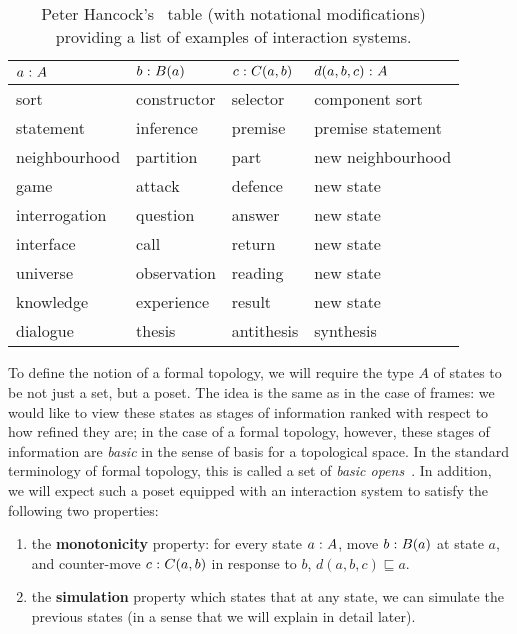 \begin{table}[tbp]
  \centering
  \caption[Hancock's table of examples of interaction systems]{%
    Peter Hancock's~\cite{hancock-interaction-systems} table (with notational
    modifications) providing a list of examples of interaction systems.
  }
  \label{tab:hancock}
  \begin{tabular}{l l l l}
    $a\hspace{0.1mm}:\hspace{0.1mm}A$ & $b\hspace{0.1mm}:\hspace{0.1mm}B(a)$ & $c\hspace{0.1mm}:\hspace{0.1mm}C(a, b)$ & $d(a, b, c)\hspace{0.1mm}:\hspace{0.1mm}A$ \\\hline
    sort           & constructor       & selector             & component sort          \\
    statement      & inference         & premise              & premise statement       \\
    neighbourhood  & partition         & part                 & new neighbourhood       \\
    game           & attack            & defence              & new state               \\
    interrogation  & question          & answer               & new state               \\
    interface      & call              & return               & new state               \\
    universe       & observation       & reading              & new state               \\
    knowledge      & experience        & result               & new state               \\
    dialogue       & thesis            & antithesis           & synthesis               \\
  \end{tabular}
\end{table}

To define the notion of a formal topology, we will require the type $A$ of states to be
not just a set, but a poset. The idea is the same as in the case of frames: we would like
to view these states as stages of information ranked with respect to how refined they are;
in the case of a formal topology, however, these stages of information are \emph{basic} in
the sense of basis for a topological space. In the standard terminology of formal
topology, this is called a set of \emph{basic opens}~\cite{coq-sambin, palmgren, nlab-formal-topo}.
In addition, we will expect such a poset equipped with an interaction
system to satisfy the following two properties:
\begin{enumerate}
  \item the \textbf{monotonicity} property: for every state
    $a\hspace{0.1mm}:\hspace{0.1mm}A$, move $b\hspace{0.1mm}:\hspace{0.1mm}B(a)$ at state $a$, and counter-move $c\hspace{0.1mm}:\hspace{0.1mm}C(a,
    b)$ in response to $b$, $d(a, b, c) \sqsubseteq a$.
  \item the \textbf{simulation} property which states that at any state, we can simulate
    the previous states (in a sense that we will explain in detail later).
\end{enumerate}

